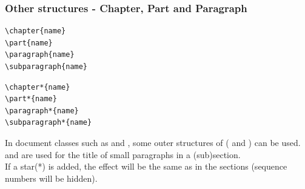 \begin{frame}[fragile]
	\frametitle{Other structures - Chapter, Part and Paragraph}
	\begin{command}
		\begin{multicols}{2}
			\begin{verbatim}
\chapter{name}
\part{name}
\paragraph{name}
\subparagraph{name}
			\end{verbatim}
			\begin{verbatim}
\chapter*{name}
\part*{name}
\paragraph*{name}
\subparagraph*{name}
			\end{verbatim}
		\end{multicols}
		\vspace{-0.5em}
	\end{command}
	In document classes such as  and , some outer structures of  (\LC{\chapter} and \LC{\part}) can be used. \\[0.5em]
	\LC{\paragraph} and \LC{\subparagraph} are used for the title of small paragraphs in a (sub)section.\\[0.5em]
	If a star(\alert{*}) is added, the effect will be the same as in the sections (sequence numbers will be hidden).
\end{frame}

